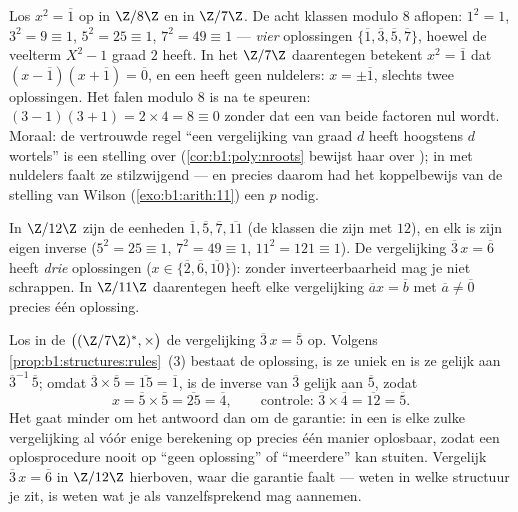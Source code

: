 \begin{example}\label{ex:b1:structures:sqrtone}
Los $x^2 = \overline 1$ op in $\Z/8\Z$ en in $\Z/7\Z$. De acht klassen
modulo $8$ aflopen: $1^2 = 1$, $3^2 = 9 \equiv 1$, $5^2 = 25 \equiv 1$,
$7^2 = 49 \equiv 1$ --- \emph{vier} oplossingen $\{\overline1,
\overline3, \overline5, \overline7\}$, hoewel de veelterm $X^2 - 1$ graad
$2$ heeft. In het  $\Z/7\Z$ daarentegen betekent $x^2 =
\overline1$ dat $(x - \overline1)(x + \overline1) = \overline0$, en een
 heeft geen nuldelers: $x = \pm\overline1$, slechts twee
oplossingen. Het falen modulo $8$ is na te speuren: $(3-1)(3+1) = 2 \times
4 = 8 \equiv 0$ zonder dat een van beide factoren nul wordt. Moraal: de
vertrouwde regel ``een vergelijking van graad $d$ heeft hoogstens $d$
wortels'' is een stelling over \emph{}
(\cref{cor:b1:poly:nroots} bewijst haar over ); in  met
nuldelers faalt ze stilzwijgend --- en precies daarom had het koppelbewijs
van de stelling van Wilson (\cref{exo:b1:arith:11}) een  $p$ nodig.
\end{example}

\begin{example}[Rekenen in $\Z/n\Z$]\label{ex:b1:structures:zncomputation}
In $\Z/12\Z$ zijn de eenheden $\overline 1, \overline 5, \overline 7,
\overline{11}$ (de klassen die  zijn met $12$), en elk is
zijn eigen inverse ($5^2 = 25 \equiv 1$, $7^2 = 49 \equiv 1$, $11^2 = 121
\equiv 1$). De vergelijking $\overline 3\, x = \overline 6$ heeft
\emph{drie} oplossingen ($x \in \{\overline 2, \overline 6,
\overline{10}\}$): zonder inverteerbaarheid mag je niet schrappen. In
$\Z/11\Z$ daarentegen heeft elke vergelijking $\overline a x = \overline
b$ met $\overline a \neq \overline 0$ precies één oplossing.
\end{example}

\begin{example}\label{ex:b1:structures:solving}
Los in de  $\bigl((\Z/7\Z)^*, \times\bigr)$ de vergelijking
$\overline 3\,x = \overline 5$ op. Volgens
\cref{prop:b1:structures:rules}~(3) bestaat de oplossing, is ze uniek en
is ze gelijk aan $\overline3^{-1}\, \overline5$; omdat $\overline3 \times
\overline5 = \overline{15} = \overline1$, is de inverse van $\overline 3$
gelijk aan $\overline 5$, zodat
\[
x = \overline5 \times \overline5 = \overline{25} = \overline4,
\qquad\text{controle: } \overline3 \times \overline4 =
\overline{12} = \overline5 .
\]
Het gaat minder om het antwoord dan om de garantie: in een  is elke
zulke vergelijking al vóór enige berekening op precies één manier
oplosbaar, zodat een oplosprocedure nooit op ``geen oplossing'' of
``meerdere'' kan stuiten. Vergelijk $\overline3\,x = \overline6$ in
$\Z/12\Z$ hierboven, waar die garantie faalt --- weten in welke structuur
je zit, is weten wat je als vanzelfsprekend mag aannemen.
\end{example}

